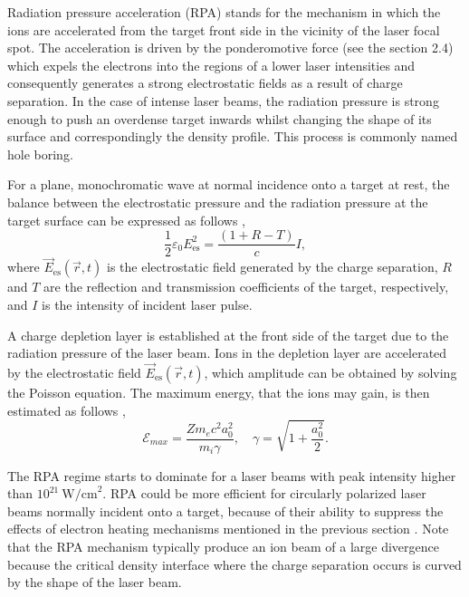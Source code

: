 Radiation pressure acceleration (RPA) stands for the mechanism in which the ions are accelerated from the target front side in the vicinity of the laser focal spot. The acceleration is driven by the ponderomotive force (see the section 2.4) which expels the electrons into the regions of a lower laser intensities and consequently generates a strong electrostatic fields as a result of charge separation. In the case of intense laser beams, the radiation pressure is strong enough to push an overdense target inwards whilst changing the shape of its surface and correspondingly the density profile. This process is commonly named hole boring.

For a plane, monochromatic wave at normal incidence onto a target at rest, the balance between the electrostatic pressure and the radiation pressure at the target surface can be expressed as follows \cite{Macchi2013},
\begin{equation}
\label{2.7.1.1}
\frac{1}{2} \varepsilon_0 E_{\mathrm{es}}^2 = \frac{\left( 1 + R - T \right)}{c} I,
\end{equation}
where $ \vec{E}_{\mathrm{es}} \left(\vec{r}, t \right) $ is the electrostatic field generated by the charge separation, $ R $ and $ T $ are the reflection and transmission coefficients of the target, respectively, and $ I $ is the intensity of incident laser pulse.

A charge depletion layer is established at the front side of the target due to the radiation pressure of the laser beam. Ions in the depletion layer are accelerated by the electrostatic field $ \vec{E}_{\mathrm{es}} \left(\vec{r}, t \right) $, which amplitude can be obtained by solving the Poisson equation. The maximum energy, that the ions may gain, is then estimated as follows \cite{Macchi2013},
\begin{equation}
\mathcal{E}_{max} = \frac{Z m_e c^2 a_0^2}{m_i \gamma}, \quad \gamma = \sqrt{1 + \frac{a_0^2}{2}}.
\end{equation}
 
The RPA regime starts to dominate for a laser beams with peak intensity higher than $ 10^{21} \  \mathrm{W/cm}^2 $. RPA could be more efficient for circularly polarized laser beams normally incident onto a target, because of their ability to suppress the effects of electron heating mechanisms mentioned in the previous section \cite{Zhang2007, Klimo2008}. Note that the RPA mechanism typically produce an ion beam of a large divergence because the critical density interface where the charge separation occurs is curved by the shape of the laser beam.

